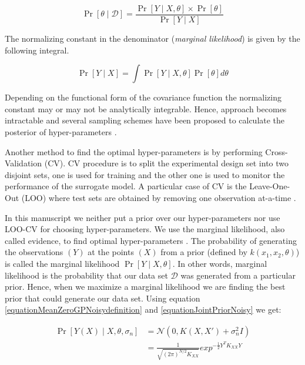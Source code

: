 \begin{equation}
    \Pr[\theta \mid \mathcal{D}] = \frac{\Pr[Y \mid X, \theta] \times \Pr[\theta]}{\Pr[Y \mid X]}
\end{equation}

The normalizing constant in the denominator (\textit{marginal likelihood}) is given by the following integral.

\begin{equation}
    \Pr[Y \mid X] = \int \Pr[Y \mid X, \theta]\Pr[\theta]d\theta
\end{equation}

Depending on the functional form of the covariance function the normalizing constant may or may not be analytically integrable. Hence, approach becomes intractable and several sampling schemes have been proposed to calculate the posterior of hyper-parameters \cite{osborne2010bayesian, neal2011mcmc}.

Another method to find the optimal hyper-parameters is by performing Cross-Validation (CV). CV procedure is to split the experimental design set into two disjoint sets, one is used for training and the other one is used to monitor the performance of the surrogate model. A particular case of CV is the Leave-One-Out (LOO) where test sets are obtained by removing one observation at-a-time \cite{rasmussen2006gaussian, dubrule1983cross, le2013multi}. 

In this manuscript we neither put a prior over our hyper-parameters nor use LOO-CV for choosing hyper-parameters. We use the marginal likelihood, also called evidence, to find optimal hyper-parameters \cite{mackay2003information}. The probability of generating the observations $(Y)$ at the points $(X)$ from a prior (defined by $k(x_{1}, x_{2}, \theta)$) is called the marginal likelihood $\Pr[Y \mid X, \theta]$. In other words, marginal likelihood is the probability that our data set $\mathcal{D}$ was generated from a particular prior. Hence, when we maximize a marginal likelihood we are finding the best prior that could generate our data set. Using equation \ref{equationMeanZeroGPNoisydefinition} and \ref{equationJointPriorNoisy} we get:

\begin{equation}\label{equationMarginalLikelihood}
\begin{aligned}
\Pr[Y(X) \mid X, \theta, \sigma_{n}] & = \mathcal{N}(0 , K(X, X') + \sigma^{2}_{n}I)  \\
& = \frac{1}{\sqrt{(2\pi)^{N/2} K_{XX}}} exp^{-\frac{1}{2}Y^{T}K_{XX}Y}
\end{aligned}
\end{equation}

